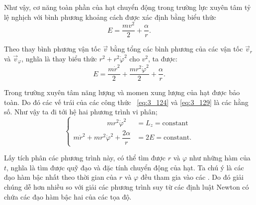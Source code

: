 \noindent
Như vậy, cơ năng toàn phần của hạt chuyển động trong trường lực xuyên tâm tỷ lệ nghịch với bình phương khoảng cách được xác định bằng biểu thức
\begin{equation}\label{eq:3_128}
E = \frac{mv^2}{2} + \frac{\alpha}{r}.
\end{equation}

\noindent
Theo  thay bình phương vận tốc  $\vec{v}$  bằng tổng các bình phương của các vận tốc $\vec{v}_r$ và $\vec{v}_{\varphi}$, nghĩa là thay biểu thức $r^2+r^2\dot{\varphi}^2$ cho $v^2$, ta được:
\begin{equation}\label{eq:3_129}
E = \frac{m\dot{r}^2}{2} + \frac{mr^2\dot{\varphi}^2}{2} + \frac{\alpha}{r}.
\end{equation}

Trong trường xuyên tâm năng lượng và momen xung lượng của hạt được bảo toàn. Do đó các vế trái của các công thức ~\eqref{eq:3_124} và \eqref{eq:3_129} là các hằng số. Như vậy ta đi tới hệ hai phương trình vi phân; 
\begin{equation}\label{eq:3_130}
\begin{cases}
\quad\quad\quad\quad\,\,\,\,\, mr^2\dot{\varphi}^2 \!\!\!\!&= L_z = \text{constant}\\
m\dot{r}^2 + mr^2\dot{\varphi}^2 + \dfrac{2\alpha}{r} \!\!\!\!&= 2E = \text{constant}.
\end{cases}
\end{equation}

\noindent
Lấy tích phân các phương trình này, có thể tìm được $r$ và $\varphi$ như những hàm của $t$, nghĩa là tìm được quỹ đạo và đặc tính chuyển động của hạt. Ta chú ý là các đạo hàm bậc nhất theo thời gian của $r$ và $\varphi$ đều tham gia vào các . Do đó giải chúng dễ hơn nhiều so với giải các phương trình suy từ các định luật Newton có chứa các đạo hàm bậc hai của các tọa độ.

